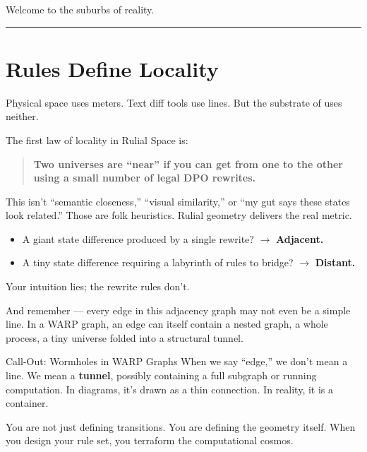 Welcome to the suburbs of reality.

\begin{center}\rule{0.5\linewidth}{0.5pt}\end{center}

\section{Rules Define Locality}
\label{7.1-rules-define-locality}

Physical space uses meters. Text diff tools use lines. But the substrate of \COMPUTER{} uses neither.

The first law of locality in Rulial Space is:

\begin{quote}
\textbf{Two universes are ``near'' if you can get from one to the other using a small number of legal DPO rewrites.}
\end{quote}

This isn’t “semantic closeness,” “visual similarity,” or “my gut says these states look related.” Those are folk heuristics. Rulial geometry delivers the real metric.

\begin{itemize}
    \item A giant state difference produced by a single rewrite? $\rightarrow$ \textbf{Adjacent.}
    \item A tiny state difference requiring a labyrinth of rules to bridge? $\rightarrow$ \textbf{Distant.}
\end{itemize}

Your intuition lies; the rewrite rules don’t.

And remember --- every edge in this adjacency graph may not even be a simple line. In a WARP graph, an edge can itself contain a nested graph, a whole process, a tiny universe folded into a structural tunnel.

\begin{callout}{Call-Out: Wormholes in WARP Graphs}
When we say “edge,” we don’t mean a line. We mean a \textbf{tunnel}, possibly containing a full subgraph or running computation. In diagrams, it’s drawn as a thin connection. In reality, it is a container.
\end{callout}

You are not just defining transitions. You are defining the geometry itself. When you design your rule set, you terraform the computational cosmos.

